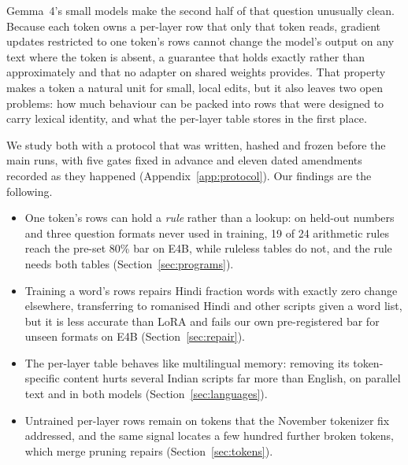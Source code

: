 \documentclass[10pt]{article}
\begin{document}
Gemma~4's small models make the second half of that question unusually clean. Because each token owns a per-layer row that only that token reads, gradient updates restricted to one token's rows cannot change the model's output on any text where the token is absent, a guarantee that holds exactly rather than approximately and that no adapter on shared weights provides. That property makes a token a natural unit for small, local edits, but it also leaves two open problems: how much behaviour can be packed into rows that were designed to carry lexical identity, and what the per-layer table stores in the first place.

We study both with a protocol that was written, hashed and frozen before the main runs, with five gates fixed in advance and eleven dated amendments recorded as they happened (Appendix~\ref{app:protocol}). Our findings are the following.
\begin{itemize}
\item One token's rows can hold a \emph{rule} rather than a lookup: on held-out numbers and three question formats never used in training, 19 of 24 arithmetic rules reach the pre-set 80\% bar on E4B, while ruleless tables do not, and the rule needs both tables (Section~\ref{sec:programs}).
\item Training a word's rows repairs Hindi fraction words with exactly zero change elsewhere, transferring to romanised Hindi and other scripts given a word list, but it is less accurate than LoRA and fails our own pre-registered bar for unseen formats on E4B (Section~\ref{sec:repair}).
\item The per-layer table behaves like multilingual memory: removing its token-specific content hurts several Indian scripts far more than English, on parallel text and in both models (Section~\ref{sec:languages}).
\item Untrained per-layer rows remain on tokens that the November tokenizer fix addressed, and the same signal locates a few hundred further broken tokens, which merge pruning repairs (Section~\ref{sec:tokens}).
\end{itemize}
\end{document}
